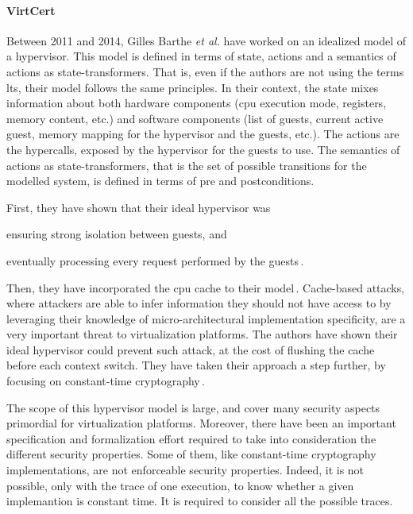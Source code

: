\paragraph{VirtCert}
%
Between 2011 and 2014, Gilles Barthe \emph{et al.} have worked on an idealized
model of a hypervisor.
%
This model is defined in terms of state, actions and a semantics of actions as
state-transformers.
%
That is, even if the authors are not using the terms \ac{lts}, their model
follows the same principles.
%
In their context, the state mixes information about both hardware components
(\ac{cpu} execution mode, registers, memory content, etc.) and software
components (list of guests, current active guest, memory mapping for the
hypervisor and the guests, etc.).
%
The actions are the hypercalls, exposed by the hypervisor for the guests to use.
%
The semantics of actions as state-transformers, that is the set of possible
transitions for the modelled system, is defined in terms of pre and postconditions.

First, they have shown that their ideal hypervisor was
%
\begin{inparaenum}[(1)]
\item ensuring strong isolation between guests, and
%
\item eventually processing every request performed by the
  guests\,\cite{barthe2011virtcert1}.
\end{inparaenum}
%
Then, they have incorporated the \ac{cpu} cache to their
model\,\cite{barthe2012virtcert2}.
%
Cache-based attacks, where attackers are able to infer information they should
not have access to by leveraging their knowledge of micro-architectural
implementation specificity, are a very important threat to virtualization
platforms.
%
The authors have shown their ideal hypervisor could prevent such attack, at the
cost of flushing the cache before each context switch.
%
They have taken their approach a step further, by focusing on constant-time
cryptography\,\cite{barthe2014virtcert3}.

The scope of this hypervisor model is large, and cover many security aspects
primordial for virtualization platforms.
%
Moreover, there have been an important specification and formalization effort
required to take into consideration the different security properties.
%
Some of them, like constant-time cryptography implementations, are not
enforceable security properties.
%
Indeed, it is not possible, only with the trace of one execution, to know
whether a given implemantion is constant time.
%
It is required to consider all the possible traces.

